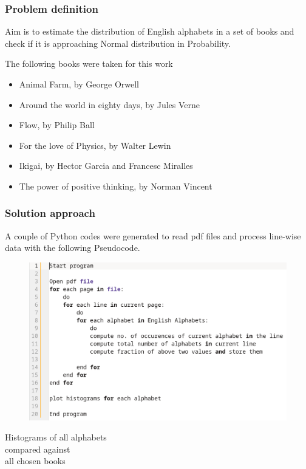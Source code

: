 
\begin{frame}
    \frametitle{Problem definition}
    Aim is to estimate the distribution of English alphabets in a set of
    books and check if it is approaching Normal distribution in Probability. \\

    \vspace{0.5cm}

    The following books were taken for this work
    \begin{itemize}
        \item Animal Farm, by George Orwell
        \item Around the world in eighty days, by Jules Verne
        \item Flow, by Philip Ball
        \item For the love of Physics, by Walter Lewin
        \item Ikigai, by Hector Garcia and Francesc Miralles
        \item The power of positive thinking, by Norman Vincent
    \end{itemize}
\end{frame}

\begin{frame}
    \frametitle{Solution approach}
    A couple of Python codes were generated to read pdf files and process line-wise
    data with the following Pseudocode.
    \begin{figure}
        \includegraphics[scale=0.22]{pseudocode.png}
    \end{figure}
\end{frame}

\begin{frame}
    \centering
     Histograms of all alphabets \\ compared against \\ all chosen books
\end{frame}

